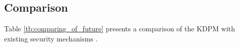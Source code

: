 

\subsection{Comparison}
Table \ref{tb:comparing_of_future} presents a comparison of the KDPM with existing
security mechanisms \cite{xmp,libhermitmpk,criswell14sp}.
%
%


